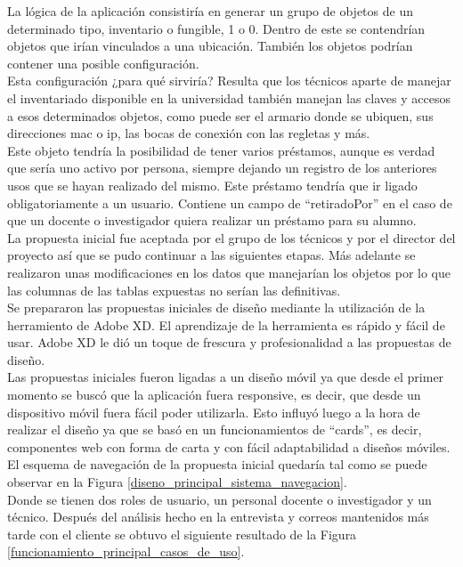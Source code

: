 La lógica de la aplicación consistiría en generar un grupo de objetos de un determinado tipo, inventario o fungible, 1 o 0. Dentro de este se contendrían objetos que irían vinculados a una ubicación. También los objetos podrían contener una posible configuración.
\\Esta configuración ¿para qué sirviría? Resulta que los técnicos aparte de manejar el inventariado disponible en la universidad también manejan las claves y accesos a esos determinados objetos, como puede ser el armario donde se ubiquen, sus direcciones mac o ip, las bocas de conexión con las regletas y más.
\\Este objeto tendría la posibilidad de tener varios préstamos, aunque es verdad que sería uno activo por persona, siempre dejando un registro de los anteriores usos que se hayan realizado del mismo. Este préstamo tendría que ir ligado obligatoriamente a un usuario. Contiene un campo de ``retiradoPor'' en el caso de que un docente o investigador quiera realizar un préstamo para su alumno.
\vspace{\baselineskip}
\\La propuesta inicial fue aceptada por el grupo de los técnicos y por el director del proyecto así que se pudo continuar a las siguientes etapas. Más adelante se realizaron unas modificaciones en los datos que manejarían los objetos por lo que las columnas de las tablas expuestas no serían las definitivas.
\\Se prepararon las propuestas iniciales de diseño mediante la utilización de la herramiento de Adobe XD. El aprendizaje de la herramienta es rápido y fácil de usar. Adobe XD le dió un toque de frescura y profesionalidad a las propuestas de diseño.
\\Las propuestas iniciales fueron ligadas a un diseño móvil ya que desde el primer momento se buscó que la aplicación fuera responsive, es decir, que desde un dispositivo móvil fuera fácil poder utilizarla. Esto influyó luego a la hora de realizar el diseño ya que se basó en un funcionamientos de ``cards'', es decir, componentes web con forma de carta y con fácil adaptabilidad a diseños móviles.
\\El esquema de navegación de la propuesta inicial quedaría tal como se puede observar en la Figura \ref{diseno_principal_sistema_navegacion}.
\\Donde se tienen dos roles de usuario, un personal docente o investigador y un técnico. Después del análisis hecho en la entrevista y correos mantenidos más tarde con el cliente se obtuvo el siguiente resultado de la Figura \ref{funcionamiento_principal_casos_de_uso}.

